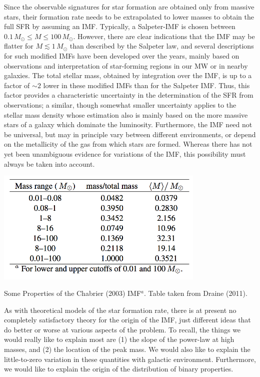 \documentclass[a4paper,10pt]{article}
\begin{document}
{\noindent}Since the observable signatures for star formation are obtained only from massive stars, their formation rate needs to be extrapolated to lower masses to obtain the full SFR by assuming an IMF. Typically, a Salpeter-IMF is chosen between $0.1\,M_\odot\leq M\leq 100\,M_\odot$. However, there are clear indications that the IMF may be flatter for $M\lesssim1\,M_\odot$ than described by the Salpeter law, and several descriptions for such modified IMFs have been developed over the years, mainly based on observations and interpretation of star-forming regions in our MW or in nearby galaxies. The total stellar mass, obtained by integration over the IMF, is up to a factor of $\sim2$ lower in these modified IMFs than for the Salpeter IMF. Thus, this factor provides a characteristic uncertainty in the determination of the SFR from observations; a similar, though somewhat smaller uncertainty applies to the stellar mass density whose estimation also is mainly based on the more massive stars of a galaxy which dominate the luminosity. Furthermore, the IMF need not be universal, but may in principle vary between different environments, or depend on the metallicity of the gas from which stars are formed. Whereas there has not yet been unambiguous evidence for variations of the IMF, this possibility must always be taken into account.

\begin{table}[t]
    \centering
    \includegraphics[width=10cm]{figures/ChabrierTable.png}
    \caption{\footnotesize{Some Properties of the Chabrier (2003) IMF$^a$. Table taken from Draine (2011).}}
    \label{table:chabrier}
\end{table}

{\noindent}As with theoretical models of the star formation rate, there is at present no completely satisfactory theory for the origin of the IMF, just different ideas that do better or worse at various aspects of the problem. To recall, the things we would really like to explain most are (1) the slope of the power-law at high masses, and (2) the location of the peak mass. We would also like to explain the little-to-zero variation in these quantities with galactic environment. Furthermore, we would like to explain the origin of the distribution of binary properties.
\end{document}
